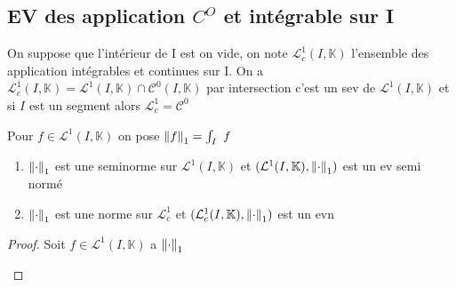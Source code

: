 \documentclass[11pt,hidelinks]{book}
\theoremstyle{mytheoremstyle}
\theoremstyle{mytheoremstyle}
\theoremstyle{mytheoremstyle}
\theoremstyle{mytheoremstyle}
\theoremstyle{mytheoremstyle}
\theoremstyle{mytheoremstyle}
\theoremstyle{mytheoremstyle}
\theoremstyle{mytheoremstyle}
\theoremstyle{myproblemstyle}
\def\mbb#1{\mathbb{#1}}
\def\mfc#1{\mathcal{#1}}
\def\L{\mfc{L}^1(I,\bK)}
\def\bK{\mbb{K}}
\begin{document}
\subsection{EV des application $C^O$ et intégrable sur I}
\begin{definition}
    On suppose que l'intérieur de I est on vide, on note $\mfc{L}^1_c(I,\bK)$ l'ensemble 
    des application intégrables et continues sur I. On a $\mfc{L}^1_c(I,\bK) = \mfc{L}^1(I,\bK) \cap \mfc{C}^0(I, \bK)$
    par intersection c'est un sev de $\L$ et si $I$ est un segment alors $\mfc{L}^1_c = \mfc{C}^0$ 
\end{definition}
\begin{adjustwidth}{-2em}{-1em}
    \begin{prop}
        Pour $f \in \L$ on pose $\norm{f}_1 = \int_{I} f$ 
        \begin{enumerate}
            \item $\norm{\mathord{\cdot}}_1$ est une seminorme sur $\L$ et $(\L,\norm{\mathord{\cdot}}_1)$ est un ev semi normé
            \item $\norm{\mathord{\cdot}}_1$ est une norme sur $\mfc{L}^1_c$ et $(\mfc{L}^1_c(I, \bK), \norm{\mathord{\cdot}}_1)$ est un evn
        \end{enumerate}
        \begin{proof}
            Soit $f \in \L$ a $\norm{\mathord{\cdot}}_1$ 
            \begin{enumerate}
            

\end{enumerate}
\end{proof}
\end{prop}
\end{adjustwidth}
\end{document}

